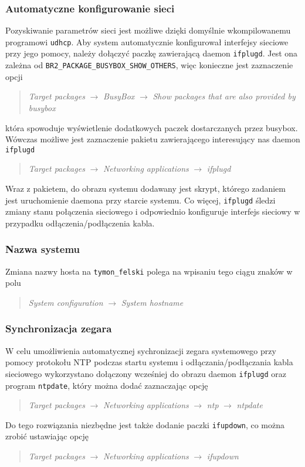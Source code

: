 \documentclass[10pt,a4paper]{article}
\begin{document}
\subsubsection{Automatyczne konfigurowanie sieci}
Pozyskiwanie parametrów sieci jest możliwe dzięki domyślnie wkompilowanemu programowi \texttt{udhcp}. Aby system automatycznie konfigurował interfejsy sieciowe przy jego pomocy, należy dołączyć paczkę zawierającą daemon \texttt{ifplugd}. Jest ona zależna od \texttt{BR2\_PACKAGE\_BUSYBOX\_SHOW\_OTHERS}, więc konieczne jest zaznaczenie opcji
\begin{quote}
\textit{Target packages} $\rightarrow$ \textit{BusyBox} $\rightarrow$ \textit{Show packages that are also provided by busybox}
\end{quote}
która spowoduje wyświetlenie dodatkowych paczek dostarczanych przez busybox. Wówczas możliwe jest zaznaczenie pakietu zawierającego interesujący nas daemon \texttt{ifplugd}
\begin{quote}
\textit{Target packages} $\rightarrow$ \textit{Networking applications} $\rightarrow$ \textit{ifplugd}
\end{quote}
Wraz z pakietem, do obrazu systemu dodawany jest skrypt, którego zadaniem jest uruchomienie daemona przy starcie systemu. Co więcej, \texttt{ifplugd} śledzi zmiany stanu połączenia sieciowego i odpowiednio konfiguruje interfejs sieciowy w przypadku odłączenia/podłączenia kabla.

\subsubsection{Nazwa systemu}
Zmiana nazwy hosta na \texttt{tymon\_felski} polega na wpisaniu tego ciągu znaków w polu
\begin{quote}
\textit{System configuration}  $\rightarrow$ \textit{System hostname}
\end{quote}
\subsubsection{Synchronizacja zegara}
W celu umożliwienia automatycznej sychronizacji zegara systemowego przy pomocy protokołu NTP podczas startu systemu i odłączania/podłączania kabla sieciowego wykorzystano dołączony wcześniej do obrazu daemon \texttt{ifplugd} oraz program \texttt{ntpdate}, który można dodać zaznaczając opcję
\begin{quote}
\textit{Target packages} $\rightarrow$ \textit{Networking applications} $\rightarrow$ \textit{ntp} $\rightarrow$ \textit{ntpdate}
\end{quote}
Do tego rozwiązania niezbędne jest także dodanie paczki \texttt{ifupdown}, co można zrobić ustawiając opcję
\begin{quote}
\textit{Target packages} $\rightarrow$ \textit{Networking applications} $\rightarrow$ \textit{ifupdown}
\end{quote}
\end{document}
